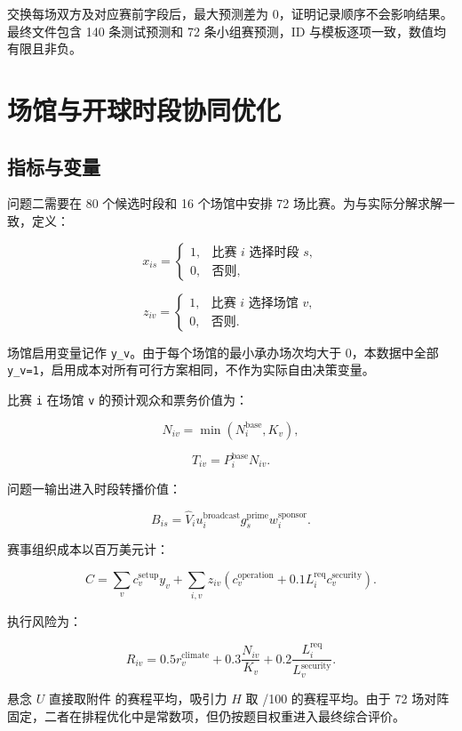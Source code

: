 交换每场双方及对应赛前字段后，最大预测差为 0，证明记录顺序不会影响结果。最终文件包含 140 条测试预测和 72 条小组赛预测，ID 与模板逐项一致，数值均有限且非负。

\FloatBarrier

\section{场馆与开球时段协同优化}

\subsection{指标与变量}

问题二需要在 80 个候选时段和 16 个场馆中安排 72 场比赛。为与实际分解求解一致，定义：

\[
x_{is}=\begin{cases}
1,&\text{比赛 }i\text{ 选择时段 }s,\\
0,&\text{否则},
\end{cases}
\]

\[
z_{iv}=\begin{cases}
1,&\text{比赛 }i\text{ 选择场馆 }v,\\
0,&\text{否则}.
\end{cases}
\]

场馆启用变量记作 \texttt{y\_v}。由于每个场馆的最小承办场次均大于 0，本数据中全部 \texttt{y\_v=1}，启用成本对所有可行方案相同，不作为实际自由决策变量。

比赛 \texttt{i} 在场馆 \texttt{v} 的预计观众和票务价值为：

\[
N_{iv}=\min(N_i^{\mathrm{base}},K_v),
\]

\[
T_{iv}=P_i^{\mathrm{base}}N_{iv}.
\]

问题一输出进入时段转播价值：

\[
B_{is}=\widehat V_i u_i^{\mathrm{broadcast}}
g_s^{\mathrm{prime}}w_i^{\mathrm{sponsor}}.
\]

赛事组织成本以百万美元计：

\[
C=\sum_v c_v^{\mathrm{setup}}y_v+
\sum_{i,v}z_{iv}\left(
c_v^{\mathrm{operation}}+0.1L_i^{\mathrm{req}}c_v^{\mathrm{security}}
\right).
\]

执行风险为：

\[
R_{iv}=0.5r_v^{\mathrm{climate}}
+0.3\frac{N_{iv}}{K_v}
+0.2\frac{L_i^{\mathrm{req}}}{L_v^{\mathrm{security}}}.
\]

悬念 $U$ 直接取附件  的赛程平均，吸引力 $H$ 取 /100 的赛程平均。由于 72 场对阵固定，二者在排程优化中是常数项，但仍按题目权重进入最终综合评价。

